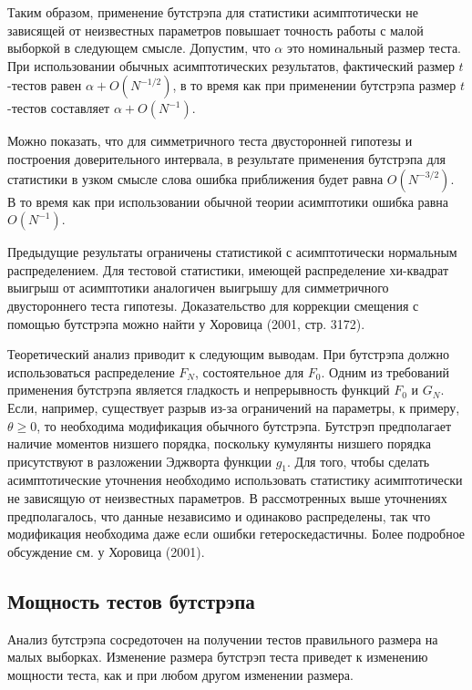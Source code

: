 Таким образом, применение бутстрэпа для статистики асимптотически  не зависящей от неизвестных параметров повышает точность работы с малой выборкой в следующем смысле. Допустим, что $\alpha$ это номинальный размер теста. При использовании обычных асимптотических результатов,  фактический размер $t$-тестов равен $\alpha+O(N^{-1/2})$, в то время как при применении бутстрэпа размер $t$-тестов составляет $\alpha+O(N^{-1})$.

Можно показать, что для симметричного теста двусторонней гипотезы и построения доверительного интервала, в результате применения бутстрэпа для статистики в узком смысле слова ошибка приближения будет равна $O(N^{-3/2})$. В то время как  при использовании обычной теории асимптотики ошибка равна $O(N^{-1})$. 

Предыдущие результаты ограничены статистикой с асимптотически нормальным распределением. Для тестовой статистики, имеющей распределение хи-квадрат выигрыш от асимптотики аналогичен выигрышу для симметричного двустороннего теста гипотезы. Доказательство для коррекции смещения с помощью бутстрэпа можно найти у  Хоровица (2001, стр. 3172).

Теоретический анализ приводит к следующим выводам. При  бутстрэпа должно использоваться  распределение $F_N$, состоятельное для $F_0$. Одним из требований применения бутстрэпа является гладкость и непрерывность функций $F_0$ и $G_N$. Если, например, существует разрыв из-за ограничений на параметры, к примеру, $\theta \geq 0$, то необходима модификация обычного бутстрэпа. Бутстрэп предполагает наличие моментов низшего порядка, поскольку кумулянты низшего порядка присутствуют в разложении Эджворта функции $g_1$. Для того, чтобы сделать асимптотические уточнения необходимо использовать статистику асимптотически не зависящую от неизвестных параметров. В рассмотренных выше уточнениях предполагалось, что данные независимо и одинаково распределены, так что модификация необходима даже если ошибки гетероскедастичны. Более подробное обсуждение см. у Хоровица (2001). 


 \subsection{Мощность тестов бутстрэпа}

Анализ бутстрэпа сосредоточен на получении тестов правильного размера на малых выборках. Изменение размера бутстрэп теста приведет к изменению мощности теста, как и при любом другом изменении размера. 

